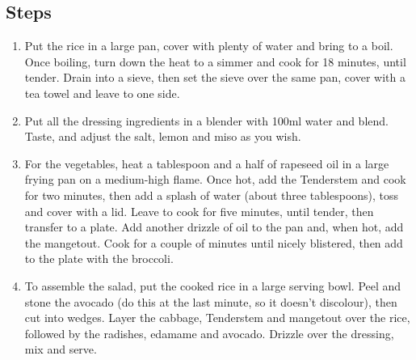 \documentclass{book}
\begin{document}
\subsection*{Steps}
\begin{enumerate}
\item Put the rice in a large pan, cover with plenty of water and bring to a boil. Once boiling, turn down the heat to a simmer and cook for 18 minutes, until tender. Drain into a sieve, then set the sieve over the same pan, cover with a tea towel and leave to one side.
\item Put all the dressing ingredients in a blender with 100ml water and blend. Taste, and adjust the salt, lemon and miso as you wish.
\item For the vegetables, heat a tablespoon and a half of rapeseed oil in a large frying pan on a medium-high flame. Once hot, add the Tenderstem and cook for two minutes, then add a splash of water (about three tablespoons), toss and cover with a lid. Leave to cook for five minutes, until tender, then transfer to a plate. Add another drizzle of oil to the pan and, when hot, add the mangetout. Cook for a couple of minutes until nicely blistered, then add to the plate with the broccoli.
\item To assemble the salad, put the cooked rice in a large serving bowl. Peel and stone the avocado (do this at the last minute, so it doesn’t discolour), then cut into wedges. Layer the cabbage, Tenderstem and mangetout over the rice, followed by the radishes, edamame and avocado. Drizzle over the dressing, mix and serve.
\end{enumerate}
\newpage
\end{document}
